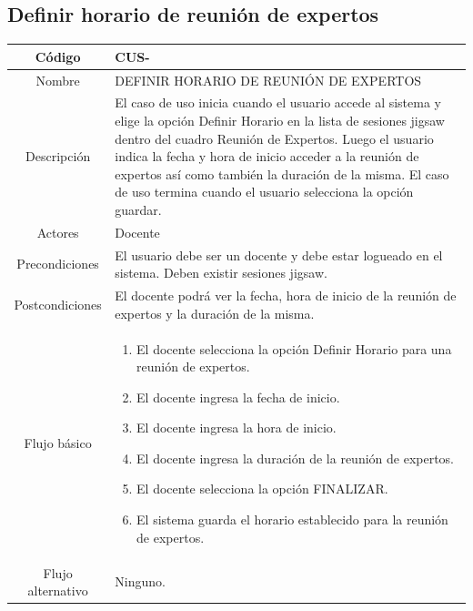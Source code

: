\subsection{Definir horario de reunión de expertos}
\begin{longtable}{|c|L{10cm}|}
	\toprule[0.8mm]
	Código &  CUS-\casodeuso\\  \midrule
	Nombre &  DEFINIR HORARIO DE REUNIÓN DE EXPERTOS\\  \midrule
	Descripción & El caso de uso inicia cuando el usuario accede al sistema y elige la opción Definir Horario en la lista de sesiones jigsaw dentro del cuadro Reunión de Expertos. Luego el usuario indica la fecha y hora de inicio acceder a la reunión de expertos así como también la duración de la misma. El caso de uso termina cuando el usuario selecciona la opción guardar. \\  \midrule
	Actores &  Docente\\  \midrule
	Precondiciones & El usuario debe ser un docente y debe estar logueado en el sistema. Deben existir sesiones jigsaw. \\  \midrule
	Postcondiciones & El docente podrá ver la fecha, hora de inicio de la reunión de expertos y la duración de la misma. \\  \midrule
	Flujo básico & \begin{enumerate}
		\item El docente selecciona la opción Definir Horario para una reunión de expertos.
		\item El docente ingresa la fecha de inicio.
		\item El docente ingresa la hora de inicio.
		\item El docente ingresa la duración de la reunión de expertos.
		\item El docente selecciona la opción FINALIZAR.
		\item El sistema guarda el horario establecido para la reunión de expertos.
	\end{enumerate}
	\\  \midrule
	Flujo alternativo & Ninguno. \\  \bottomrule[0.8mm]
\end{longtable}
\clearpage
